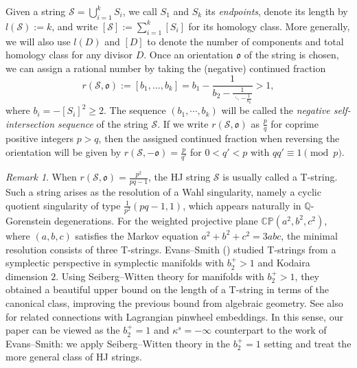 \documentclass[11pt]{article}
\theoremstyle{definition}
\theoremstyle{remark}
\newtheorem{remark}[theorem]{Remark}
\newcommand{\CP}{\mathbb{CP}}
\newcommand{\st}{\mathcal{S}}
\newcommand{\sto}{\mathfrak{o}}
\begin{document}
Given a string $\st=\bigcup_{i=1}^k S_i$, we call $S_1$ and $S_k$ its \emph{endpoints}, denote its length by $l(\st):=k$, and write $[\st]:=\sum_{i=1}^k [S_i]$ for its homology class. More generally, we will also use $l(D)$ and $[D]$ to denote the number of components and total homology class for any divisor $D$. Once an orientation $\mathfrak{o}$ of the string is chosen, we can assign a rational number by taking the (negative) continued fraction
\[
  r(\st,\sto):=[b_1,\dots,b_k]=b_1-\frac{1}{b_2-\frac{1}{\ddots-\frac{1}{b_k}}}>1,
\]
where $b_i=-[S_i]^2\geq 2$. The sequence $(b_1,\cdots,b_k)$ will be called the \emph{negative self-intersection sequence} of the string $\st$. If we write $r(\st,\sto)$ as $\frac{p}{q}$ for coprime positive integers $p>q$, then the assigned continued fraction when reversing the orientation will be given by $r(\st,-\sto)=\frac{p}{q'}$ for $0<q'<p$ with $qq'\equiv 1\pmod p$.

\begin{remark}
 When $r(\st,\sto)=\frac{p^2}{pq-1}$, the HJ string $\st$ is usually called a T-string. Such a string arises as the resolution of a Wahl singularity, namely a cyclic quotient singularity of type $\frac{1}{p^2}(pq-1,1)$, which appears naturally in $\mathbb{Q}$-Gorenstein degenerations. For the weighted projective plane $\CP(a^2,b^2,c^2)$, where $(a,b,c)$ satisfies the Markov equation $a^2+b^2+c^2=3abc$, the minimal resolution consists of three T-strings. Evans--Smith (\cite{evanssmithwahl}) studied T-strings from a symplectic perspective in symplectic manifolds with $b_2^+>1$ and Kodaira dimension $2$. Using Seiberg--Witten theory for manifolds with $b_2^+>1$, they obtained a beautiful upper bound on the length of a T-string in terms of the canonical class, improving the previous bound from algebraic geometry. See also \cite{evanssmithpinwheel} for related connections with Lagrangian pinwheel embeddings. In this sense, our paper can be viewed as the $b_2^+=1$ and $\kappa^s=-\infty$ counterpart to the work of Evans--Smith: we apply Seiberg--Witten theory in the $b_2^+=1$ setting and treat the more general class of HJ strings.
\end{remark}
\end{document}
